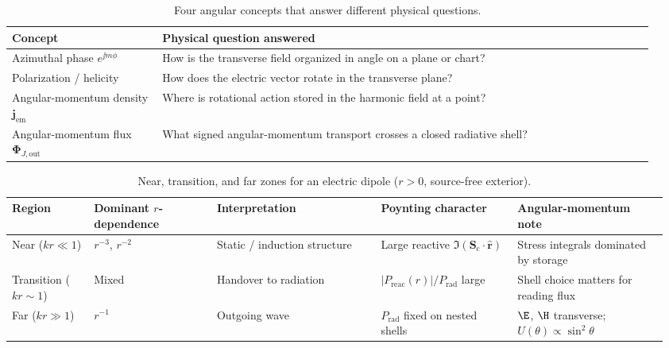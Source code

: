 \begin{table}[t]
\centering
\caption{Four angular concepts that answer different physical questions.}
\label{tab:ch1.four-not-confused}
\small
\begin{tabular}{@{}p{0.22\linewidth}p{0.72\linewidth}@{}}
\toprule
Concept & Physical question answered \\
\midrule
Azimuthal phase $e^{\jj m\phi}$
& How is the transverse field organized in angle on a plane or chart? \\
Polarization / helicity
& How does the electric vector rotate in the transverse plane? \\
Angular-momentum density $\mathbf{j}_{\mathrm{em}}$
& Where is rotational action stored in the harmonic field at a point? \\
Angular-momentum flux $\boldsymbol{\Phi}_{J,\mathrm{out}}$
& What signed angular-momentum transport crosses a closed radiative shell? \\
\bottomrule
\end{tabular}
\end{table}

\begin{table}[t]
\centering
\caption{Near, transition, and far zones for an electric dipole ($r>0$, source-free exterior).}
\label{tab:ch1.near-far-zones}
\small
\begin{tabular}{@{}p{0.12\linewidth}p{0.18\linewidth}p{0.24\linewidth}p{0.20\linewidth}p{0.22\linewidth}@{}}
\toprule
Region & Dominant $r$-dependence & Interpretation & Poynting character & Angular-momentum note \\
\midrule
Near ($kr\ll1$) & $r^{-3}$, $r^{-2}$ & Static / induction structure & Large reactive $\Im(\mathbf{S}_\mathrm{c}\cdot\hat{\mathbf{r}})$ & Stress integrals dominated by storage \\
Transition ($kr\sim1$) & Mixed & Handover to radiation & $|P_{\mathrm{reac}}(r)|/P_{\mathrm{rad}}$ large & Shell choice matters for reading flux \\
Far ($kr\gg1$) & $r^{-1}$ & Outgoing wave & $P_{\mathrm{rad}}$ fixed on nested shells & $\E$, $\H$ transverse; $U(\theta)\propto\sin^2\theta$ \\
\bottomrule
\end{tabular}
\end{table}
